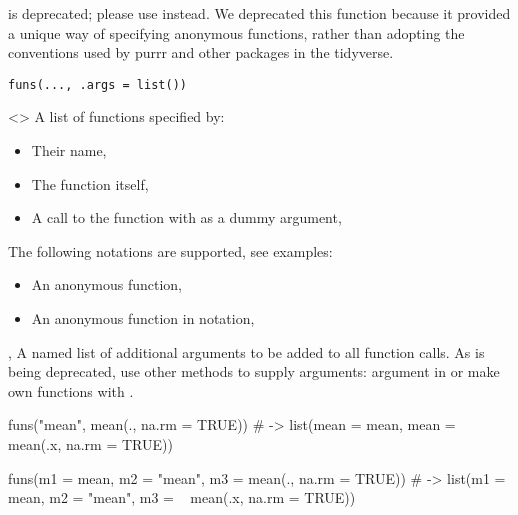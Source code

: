 \documentclass[a4paper]{book}
\begin{document}
%
\begin{Description}
\strong{[Deprecated]}

 is deprecated; please use  instead. We deprecated this
function because it provided a unique way of specifying anonymous functions,
rather than adopting the conventions used by purrr and other packages
in the tidyverse.
\end{Description}
%
\begin{Usage}
\begin{verbatim}
funs(..., .args = list())
\end{verbatim}
\end{Usage}
%
\begin{Arguments}
\begin{ldescription}
\item[\code{...}] <> A list of functions
specified by:
\begin{itemize}

\item{} Their name, 
\item{} The function itself, 
\item{} A call to the function with  as a dummy argument,

\end{itemize}


The following notations are  supported, see examples:
\begin{itemize}

\item{} An anonymous function, 
\item{} An anonymous function in  notation, 

\end{itemize}


\item[\code{.args}, \code{args}] A named list of additional arguments to be added to all
function calls. As  is being deprecated, use other methods to
supply arguments:  argument in  or make
own functions with .
\end{ldescription}
\end{Arguments}
%
\begin{Examples}
\begin{ExampleCode}
funs("mean", mean(., na.rm = TRUE))
# ->
list(mean = mean, mean = ~ mean(.x, na.rm = TRUE))

funs(m1 = mean, m2 = "mean", m3 = mean(., na.rm = TRUE))
# ->
list(m1 = mean, m2 = "mean", m3 = ~ mean(.x, na.rm = TRUE))
\end{ExampleCode}
\end{Examples}
\end{document}
